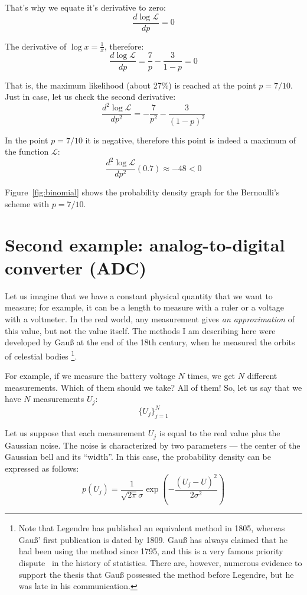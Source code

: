 \documentclass[notitlepage,oneside]{book}
\begin{document}
That's why we equate it's derivative to zero:
$$\frac{d \log \mathcal{L}}{dp} = 0$$

The derivative of $\log x = \frac{1}{x}$, therefore:
$$\frac{d \log \mathcal{L}}{dp} = \frac{7}{p} - \frac{3}{1-p} = 0$$

That is, the maximum likelihood (about 27\%) is reached at the point $p=7/10$.
Just in case, let us check the second derivative:
$$\frac{d^2 \log \mathcal{L}}{dp^2} = -\frac{7}{p^2} - \frac{3}{(1-p)^2}$$

In the point $p=7/10$ it is negative, therefore this point is indeed a maximum of the function $\mathcal{L}$:
$$\frac{d^2 \log \mathcal{L}}{dp^2}(0.7)  \approx -48 < 0$$

Figure~\ref{fig:binomial} shows the probability density graph for the Bernoulli's scheme with $p=7/10$.


\section{Second example: analog-to-digital converter (ADC)}

Let us imagine that we have a constant physical quantity that we want to measure; for example, it can be a length to measure with a ruler or a voltage with a voltmeter.
In the real world, any measurement gives \textit{an approximation} of this value, but not the value itself.
The methods I am describing here were developed by Gauß at the end of the 18th century, when he measured the orbits of celestial bodies
\footnote{Note that Legendre has published an equivalent method in 1805, 
whereas Gauß' first publication is dated by 1809. Gauß has always claimed that he had been using the method since 1795,
and this is a very famous priority dispute~\cite{} in the history of statistics.
There are, however, numerous evidence to support the thesis that Gauß possessed the method before Legendre, but he was late in his communication.}.
~\cite{}

For example, if we measure the battery voltage $N$ times, we get $N$ different measurements. Which of them should we take? All of them! 
So, let us say that we have $N$ measurements $U_j$:
$$
\{U_j\}_{j=1}^{N}
$$

Let us suppose that each measurement $U_j$ is equal to the real value plus the Gaussian noise. 
The noise is characterized by two parameters --- the center of the Gaussian bell and its ``width''. 
In this case, the probability density can be expressed as follows:
$$
p(U_j) = \frac{1}{\sqrt{2\pi}\sigma} \exp\left(-\frac{(U_j-U)^2}{2\sigma^2}\right)
$$
\end{document}

